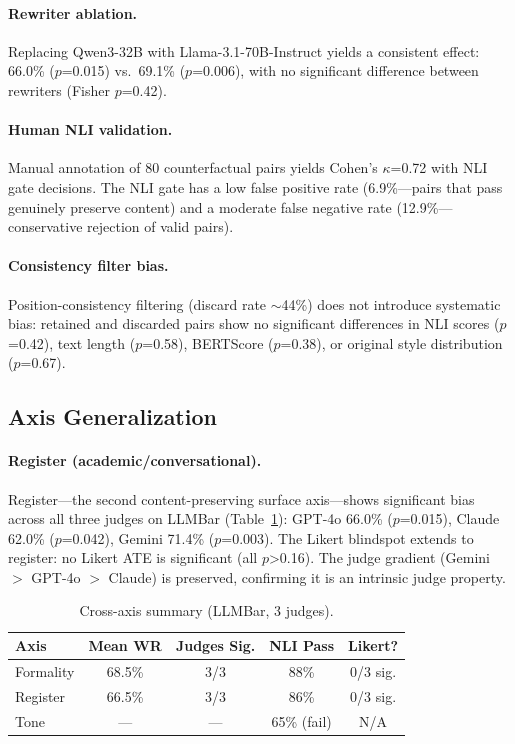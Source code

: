 \documentclass[11pt,a4paper]{article}
\begin{document}
\paragraph{Rewriter ablation.}
Replacing Qwen3-32B with Llama-3.1-70B-Instruct yields a consistent effect: 66.0\% ($p$=0.015) vs.\ 69.1\% ($p$=0.006), with no significant difference between rewriters (Fisher $p$=0.42).

\paragraph{Human NLI validation.}
Manual annotation of 80 counterfactual pairs yields Cohen's $\kappa$=0.72 with NLI gate decisions.
The NLI gate has a low false positive rate (6.9\%---pairs that pass genuinely preserve content) and a moderate false negative rate (12.9\%---conservative rejection of valid pairs).

\paragraph{Consistency filter bias.}
Position-consistency filtering (discard rate $\sim$44\%) does not introduce systematic bias: retained and discarded pairs show no significant differences in NLI scores ($p$=0.42), text length ($p$=0.58), BERTScore ($p$=0.38), or original style distribution ($p$=0.67).

\subsection{Axis Generalization}

\paragraph{Register (academic/conversational).}
Register---the second content-preserving surface axis---shows significant bias across all three judges on LLMBar (Table~\ref{tab:register}): GPT-4o 66.0\% ($p$=0.015), Claude 62.0\% ($p$=0.042), Gemini 71.4\% ($p$=0.003).
The Likert blindspot extends to register: no Likert ATE is significant (all $p$>0.16).
The judge gradient (Gemini $>$ GPT-4o $>$ Claude) is preserved, confirming it is an intrinsic judge property.

\begin{table}[t]
\centering
\small
\caption{Cross-axis summary (LLMBar, 3 judges).}
\label{tab:register}
\begin{tabular}{lcccc}
\toprule
\textbf{Axis} & \textbf{Mean WR} & \textbf{Judges Sig.} & \textbf{NLI Pass} & \textbf{Likert?} \\
\midrule
Formality  & 68.5\% & 3/3 & 88\% & 0/3 sig. \\
Register   & 66.5\% & 3/3 & 86\% & 0/3 sig. \\
Tone       & ---    & ---  & 65\% (fail) & N/A \\
\bottomrule
\end{tabular}
\end{table}
\end{document}
